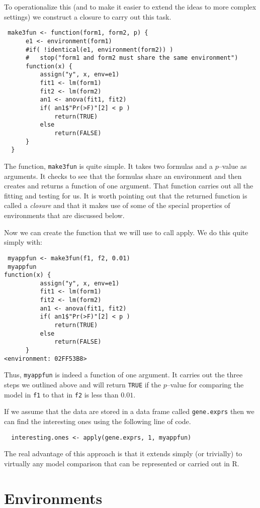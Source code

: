 \documentclass{article}
\begin{document}
To operationalize this (and to make it easier to extend the ideas to
more complex settings) we construct a closure to carry out this task.
\begin{verbatim}
 make3fun <- function(form1, form2, p) {
      e1 <- environment(form1)
      #if( !identical(e1, environment(form2)) )
      #   stop("form1 and form2 must share the same environment")
      function(x) {
          assign("y", x, env=e1)
          fit1 <- lm(form1)
          fit2 <- lm(form2)
          an1 <- anova(fit1, fit2)
          if( an1$"Pr(>F)"[2] < p )
              return(TRUE)
          else
              return(FALSE)
      }
  }
\end{verbatim}
The function, \verb+make3fun+ is quite simple. It takes two formulas
and a $p$--value as arguments. It checks to see that the formulas
share an environment and then creates and returns a function of one
argument. That function carries out all the fitting and testing for
us.
It is worth pointing out that the returned function is called a
{\em closure} and that it makes use of some of the special properties
of environments that are discussed below.

Now we can create the function that we will use to call apply.
We do this quite simply with:
\begin{verbatim}
 myappfun <- make3fun(f1, f2, 0.01)
 myappfun
function(x) {
          assign("y", x, env=e1)
          fit1 <- lm(form1)
          fit2 <- lm(form2)
          an1 <- anova(fit1, fit2)
          if( an1$"Pr(>F)"[2] < p )
              return(TRUE)
          else
              return(FALSE)
      }
<environment: 02FF53B8>
\end{verbatim}
Thus, \verb+myappfun+ is indeed a function of one argument. It carries
out the three steps we outlined above and will return \verb+TRUE+ if
the $p$--value for comparing the model in \verb+f1+ to that in
\verb+f2+ is less than $0.01$.

If we assume that the data are stored in a data frame called
\verb+gene.exprs+ then we can find the interesting ones using the
following line of code.
\begin{verbatim}
  interesting.ones <- apply(gene.exprs, 1, myappfun)
\end{verbatim}

The real advantage of this approach is that it extends simply (or
trivially) to virtually any model comparison that can be represented
or carried out in R.

\section{Environments}
\end{document}
